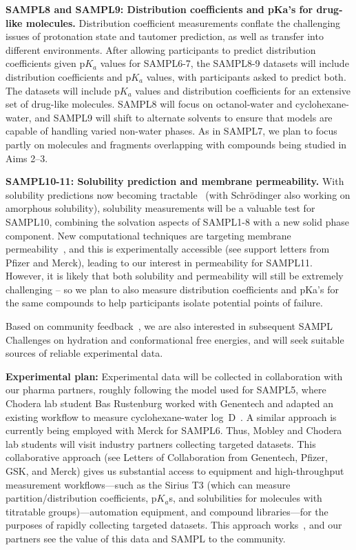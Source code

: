 \documentclass[11pt]{article}
\begin{document}
\textbf{SAMPL8 and SAMPL9: Distribution coefficients and pKa's for drug-like molecules.} 
Distribution coefficient measurements conflate the challenging issues of protonation state and tautomer prediction, as well as transfer into different environments. 
After allowing participants to predict distribution coefficients given p$K_a$ values for SAMPL6-7, the SAMPL8-9 datasets will include distribution coefficients and p$K_a$ values, with participants asked to predict both. 
The datasets will include p$K_a$ values and distribution coefficients for an extensive set of drug-like molecules.
SAMPL8 will focus on octanol-water and cyclohexane-water, and SAMPL9 will shift to alternate solvents to ensure that models are capable of handling varied non-water phases. 
As in SAMPL7, we plan to focus partly on molecules and fragments overlapping with compounds being studied in Aims 2--3.

\textbf{SAMPL10-11: Solubility prediction and membrane permeability.}
With solubility predictions now becoming tractable~\cite{Schnieders:2012:J.Chem.TheoryComput., park_absolute_2014, liu_using_2016} (with Schr\"{o}dinger also working on amorphous solubility), solubility measurements will be a valuable test for SAMPL10, combining the solvation aspects of SAMPL1-8 with a new solid phase component.
New computational techniques are targeting membrane permeability~\cite{lee_permeability_2016, comer_permeability_2014}, and this is experimentally accessible (see support letters from Pfizer and Merck), leading to our interest in permeability for SAMPL11.
However, it is likely that both solubility and permeability will still be extremely challenging -- so we plan to also measure distribution coefficients and pKa's for the same compounds to help participants isolate potential points of failure.

Based on community feedback~\cite{Mobley:2017:eScholarship}, we are also interested in subsequent SAMPL Challenges on hydration and conformational free energies, and will seek suitable sources of reliable experimental data.

{\bf Experimental plan:}
Experimental data will be collected in collaboration with our pharma partners, roughly following the model used for SAMPL5, where Chodera lab student Bas Rustenburg worked with Genentech and adapted an existing workflow to measure cyclohexane-water log~D~\cite{rustenburg_measuring_2016}.
A similar approach is currently being employed with Merck for SAMPL6.
Thus, Mobley and Chodera lab students will visit industry partners collecting targeted datasets.
This collaborative approach (see Letters of Collaboration from Genentech, Pfizer, GSK, and Merck) gives us substantial access to equipment and high-throughput measurement workflows---such as the Sirius T3 (which can measure partition/distribution coefficients, p$K_a$s, and solubilities for molecules with titratable groups)---automation equipment, and compound libraries---for the purposes of rapidly collecting targeted datasets.
This approach works~\cite{rustenburg_measuring_2016}, and our partners see the value of this data and SAMPL to the community.
\end{document}
